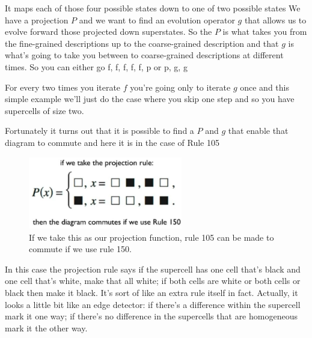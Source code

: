 \documentclass[]{article}
\begin{document}
It maps each of those four possible states down to one of two possible states
We have a projection $P$ and we want to
find an evolution operator $g$
that allows us to evolve forward
those projected down superstates.
So the $P$ is what takes you from the
fine-grained descriptions up
to the coarse-grained description
and that $g$ is what's going to take you
between to coarse-grained descriptions
at different times.
So you can either go
f, f, f, f, f, p or
p, g, g

For every two times you iterate $f$ you're going only to iterate $g$ once and this simple example we'll just do the case where you skip one step and so you have supercells of size two.

Fortunately it turns out that it is possible to find a $P$ and $g$ that enable that diagram to commute and here it is in the case of Rule 105

\begin{figure}[H]
	\begin{center}
		\caption[Rule 105 can be made to commute]{If we take this as our projection function, rule 105 can be made to commute if we use rule 150.}\label{fig:rule105-P}
		\includegraphics[width=0.6\textwidth]{rule105-P}
	\end{center}
\end{figure}
In this case the projection rule says if the supercell has one cell that's black and one cell that's white, make that all white; if both cells are white or both cells or black then make it black.
It's sort of like an extra rule itself in fact.
Actually, it looks a little bit like an edge detector: if there's a difference within the supercell mark it one way; if there's no difference in the supercells that are homogeneous mark it the other way.
\end{document}
